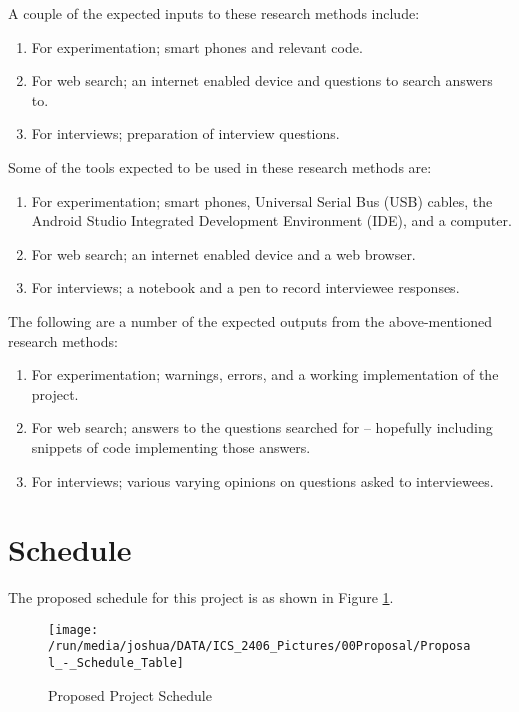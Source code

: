 \documentclass[12pt,svgnames,smaller]{article} %
\begin{document}
A couple of the expected inputs to these research methods include:

\begin{enumerate}
	\item For experimentation; smart phones and relevant code.
	\item For web search; an internet enabled device and questions to search answers to. 
	\item For interviews; preparation of interview questions.
\end{enumerate}

Some of the tools expected to be used in these research methods are:

\begin{enumerate}
	\item For experimentation; smart phones, Universal Serial Bus (USB) cables, the Android Studio Integrated Development Environment (IDE), and a computer.
	\item For web search; an internet enabled device and a web browser.
	\item For interviews; a notebook and a pen to record interviewee responses.
\end{enumerate}

The following are a number of the expected outputs from the above-mentioned research methods:

\begin{enumerate}
	\item For experimentation; warnings, errors, and a working implementation of the project.
	\item For web search; answers to the questions searched for – hopefully including snippets of code implementing those answers.  
	\item For interviews; various varying opinions on questions asked to interviewees.
\end{enumerate}



\section{ \textbf{ Schedule } } 

The proposed schedule for this project is as shown in Figure \ref{fig:Proposal:Proposed_Project_Schedule}.

\begin{figure}[h]
	\centering
	\texttt{[image: /run/media/joshua/DATA/ICS\_2406\_Pictures/00Proposal/Proposal\_-\_Schedule\_Table]}
	\caption{Proposed Project Schedule}
	\label{fig:Proposal:Proposed_Project_Schedule}
\end{figure}
\end{document}

